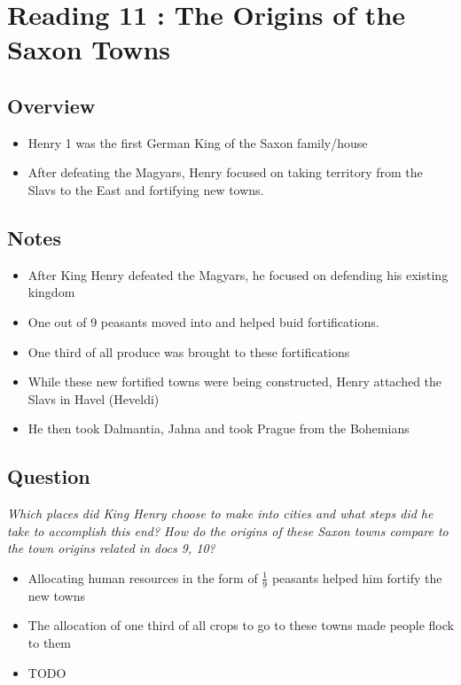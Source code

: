 \documentclass[12pt]{article}
\begin{document}
\section*{Reading 11 : The Origins of the Saxon Towns}

\subsection*{Overview}

\begin{itemize}
	\item Henry 1 was the first German King of the Saxon family/house
	\item After defeating the Magyars, Henry focused on taking territory from the Slavs to the East and fortifying new towns.
\end{itemize}

\subsection*{Notes}

\begin{itemize}
	\item After King Henry defeated the Magyars, he focused on defending his existing kingdom
	\item One out of 9 peasants moved into and helped buid fortifications. 
	\item One third of all produce was brought to these fortifications
	\item While these new fortified towns were being constructed, Henry attached the Slavs in Havel (Heveldi)
	\item He then took Dalmantia, Jahna and took Prague from the Bohemians
\end{itemize}

\subsection*{Question}

\textit{Which places did King Henry choose to make into cities and what steps did he take to accomplish this end? How do the origins of these Saxon towns compare to the town origins related in docs 9, 10?}

\begin{itemize}
	\item Allocating human resources in the form of $\frac{1}{9}$ peasants helped him fortify the new towns
	\item The allocation of one third of all crops to go to these towns made people flock to them
	\item TODO
\end{itemize}
\end{document}
